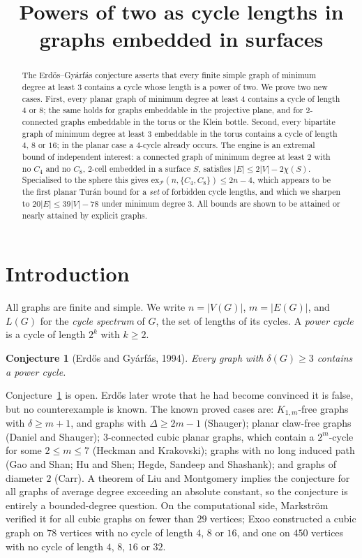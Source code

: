 \documentclass[11pt]{article}
\title{Powers of two as cycle lengths in graphs embedded in surfaces}
\author{}
\date{}
\theoremstyle{plain}
\newtheorem{conjecture}[theorem]{Conjecture}
\theoremstyle{definition}
\newcommand{\Cfour}{C_4}
\newcommand{\Ceight}{C_8}
\begin{document}
\maketitle

\begin{abstract}
The Erd\H{o}s--Gy\'arf\'as conjecture asserts that every finite simple graph of
minimum degree at least $3$ contains a cycle whose length is a power of two. We
prove two new cases. First, every planar graph of minimum degree at least $4$
contains a cycle of length $4$ or $8$; the same holds for graphs embeddable in
the projective plane, and for $2$-connected graphs embeddable in the torus or
the Klein bottle. Second, every bipartite graph of minimum degree at least $3$
embeddable in the torus contains a cycle of length $4$, $8$ or $16$; in the
planar case a $4$-cycle already occurs. The engine is an extremal bound of
independent interest: a connected graph of minimum degree at least $2$ with no
$\Cfour$ and no $\Ceight$, $2$-cell embedded in a surface $S$, satisfies
$|E|\le 2|V|-2\chi(S)$. Specialised to the sphere this gives
$\mathrm{ex}_{\mathcal P}(n,\{\Cfour,\Ceight\})\le 2n-4$, which appears to be
the first planar Tur\'an bound for a \emph{set} of forbidden cycle lengths, and
which we sharpen to $20|E|\le 39|V|-78$ under minimum degree $3$. All bounds are
shown to be attained or nearly attained by explicit graphs.
\end{abstract}

\section{Introduction}

All graphs are finite and simple. We write $n=|V(G)|$, $m=|E(G)|$, and
$L(G)$ for the \emph{cycle spectrum} of $G$, the set of lengths of its cycles.
A \emph{power cycle} is a cycle of length $2^k$ with $k\ge2$.

\begin{conjecture}[Erd\H{o}s and Gy\'arf\'as, 1994]\label{conj:eg}
Every graph with $\delta(G)\ge3$ contains a power cycle.
\end{conjecture}

Conjecture~\ref{conj:eg} is open. Erd\H{o}s later wrote that he had become
convinced it is false, but no counterexample is known. The known proved cases
are: $K_{1,m}$-free graphs with $\delta\ge m+1$, and graphs with
$\Delta\ge2m-1$ (Shauger); planar claw-free graphs (Daniel and Shauger);
$3$-connected cubic planar graphs, which contain a $2^m$-cycle for some
$2\le m\le 7$ (Heckman and Krakovski); graphs with no long induced path (Gao and
Shan; Hu and Shen; Hegde, Sandeep and Shashank); and graphs of diameter $2$
(Carr). A theorem of Liu and Montgomery implies the conjecture for all graphs of
average degree exceeding an absolute constant, so the conjecture is entirely a
bounded-degree question. On the computational side, Markstr\"om verified it for
all cubic graphs on fewer than $29$ vertices; Exoo constructed a cubic graph on
$78$ vertices with no cycle of length $4$, $8$ or $16$, and one on $450$
vertices with no cycle of length $4$, $8$, $16$ or $32$.
\end{document}
